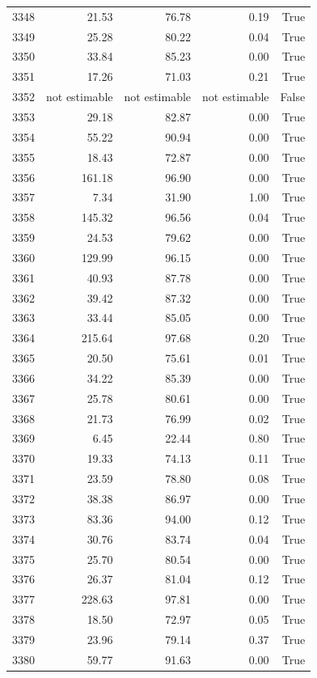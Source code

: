 \begin{longtable}{rrrrr}
3348 & 21.53 & 76.78 & 0.19 & True \\
3349 & 25.28 & 80.22 & 0.04 & True \\
3350 & 33.84 & 85.23 & 0.00 & True \\
3351 & 17.26 & 71.03 & 0.21 & True \\
3352 & not estimable & not estimable & not estimable & False \\
3353 & 29.18 & 82.87 & 0.00 & True \\
3354 & 55.22 & 90.94 & 0.00 & True \\
3355 & 18.43 & 72.87 & 0.00 & True \\
3356 & 161.18 & 96.90 & 0.00 & True \\
3357 & 7.34 & 31.90 & 1.00 & True \\
3358 & 145.32 & 96.56 & 0.04 & True \\
3359 & 24.53 & 79.62 & 0.00 & True \\
3360 & 129.99 & 96.15 & 0.00 & True \\
3361 & 40.93 & 87.78 & 0.00 & True \\
3362 & 39.42 & 87.32 & 0.00 & True \\
3363 & 33.44 & 85.05 & 0.00 & True \\
3364 & 215.64 & 97.68 & 0.20 & True \\
3365 & 20.50 & 75.61 & 0.01 & True \\
3366 & 34.22 & 85.39 & 0.00 & True \\
3367 & 25.78 & 80.61 & 0.00 & True \\
3368 & 21.73 & 76.99 & 0.02 & True \\
3369 & 6.45 & 22.44 & 0.80 & True \\
3370 & 19.33 & 74.13 & 0.11 & True \\
3371 & 23.59 & 78.80 & 0.08 & True \\
3372 & 38.38 & 86.97 & 0.00 & True \\
3373 & 83.36 & 94.00 & 0.12 & True \\
3374 & 30.76 & 83.74 & 0.04 & True \\
3375 & 25.70 & 80.54 & 0.00 & True \\
3376 & 26.37 & 81.04 & 0.12 & True \\
3377 & 228.63 & 97.81 & 0.00 & True \\
3378 & 18.50 & 72.97 & 0.05 & True \\
3379 & 23.96 & 79.14 & 0.37 & True \\
3380 & 59.77 & 91.63 & 0.00 & True \\

\end{longtable}
